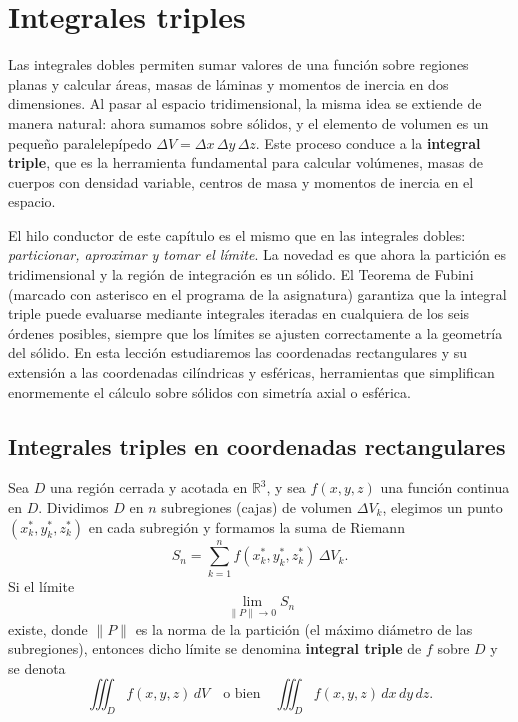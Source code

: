 \chapter{Integrales triples}

Las integrales dobles permiten sumar valores de una función sobre regiones planas y calcular áreas, masas de láminas y momentos de inercia en dos dimensiones. Al pasar al espacio tridimensional, la misma idea se extiende de manera natural: ahora sumamos sobre sólidos, y el elemento de volumen es un pequeño paralelepípedo \(\Delta V = \Delta x\,\Delta y\,\Delta z\). Este proceso conduce a la \textbf{integral triple}, que es la herramienta fundamental para calcular volúmenes, masas de cuerpos con densidad variable, centros de masa y momentos de inercia en el espacio.

El hilo conductor de este capítulo es el mismo que en las integrales dobles: \emph{particionar, aproximar y tomar el límite}. La novedad es que ahora la partición es tridimensional y la región de integración es un sólido. El Teorema de Fubini (marcado con asterisco en el programa de la asignatura) garantiza que la integral triple puede evaluarse mediante integrales iteradas en cualquiera de los seis órdenes posibles, siempre que los límites se ajusten correctamente a la geometría del sólido. En esta lección estudiaremos las coordenadas rectangulares y su extensión a las coordenadas cilíndricas y esféricas, herramientas que simplifican enormemente el cálculo sobre sólidos con simetría axial o esférica.

\section{Integrales triples en coordenadas rectangulares}

\begin{definition}
Sea \(D\) una región cerrada y acotada en \(\mathbb{R}^3\), y sea \(f(x,y,z)\) una función continua en \(D\). Dividimos \(D\) en \(n\) subregiones (cajas) de volumen \(\Delta V_k\), elegimos un punto \((x_k^*, y_k^*, z_k^*)\) en cada subregión y formamos la suma de Riemann
\[
S_n = \sum_{k=1}^{n} f(x_k^*, y_k^*, z_k^*)\,\Delta V_k.
\]
Si el límite
\[
\lim_{\|P\| \to 0} S_n
\]
existe, donde \(\|P\|\) es la norma de la partición (el máximo diámetro de las subregiones), entonces dicho límite se denomina \textbf{integral triple} de \(f\) sobre \(D\) y se denota
\[
\iiint_D f(x,y,z)\,dV
\quad\text{o bien}\quad
\iiint_D f(x,y,z)\,dx\,dy\,dz.
\]
\end{definition}

